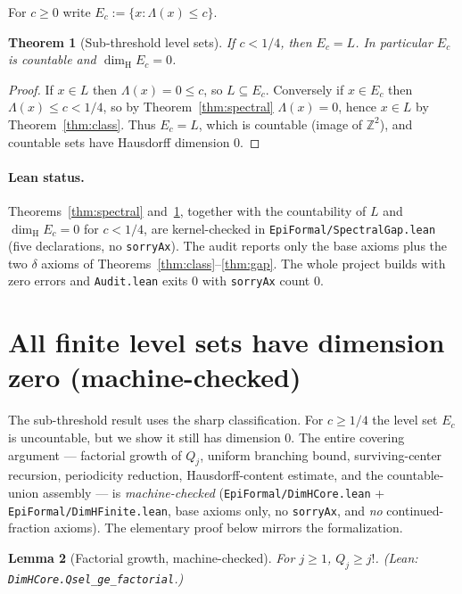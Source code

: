 \documentclass[11pt]{article}
\newtheorem{theorem}{Theorem}
\newtheorem{lemma}[theorem]{Lemma}
\theoremstyle{definition}
\theoremstyle{remark}
\newcommand{\Z}{\mathbb{Z}}
\newcommand{\dimH}{\dim_{\mathrm{H}}}
\newcommand{\Lam}{\Lambda}
\begin{document}
For $c\ge0$ write $E_c:=\{x:\Lam(x)\le c\}$.

\begin{theorem}[Sub-threshold level sets]\label{thm:sub}
If $c<1/4$, then $E_c=L$. In particular $E_c$ is countable and
$\dimH E_c=0$.
\end{theorem}

\begin{proof}
If $x\in L$ then $\Lam(x)=0\le c$, so $L\subseteq E_c$. Conversely if
$x\in E_c$ then $\Lam(x)\le c<1/4$, so by Theorem~\ref{thm:spectral}
$\Lam(x)=0$, hence $x\in L$ by Theorem~\ref{thm:class}. Thus $E_c=L$, which is
countable (image of $\Z^2$), and countable sets have Hausdorff dimension $0$.
\end{proof}

\paragraph{Lean status.} Theorems~\ref{thm:spectral} and~\ref{thm:sub}, together
with the countability of $L$ and $\dimH E_c=0$ for $c<1/4$, are kernel-checked in
\texttt{EpiFormal/SpectralGap.lean} (five declarations, no \texttt{sorryAx}).
The audit reports only the base axioms plus the two $\delta$ axioms of
Theorems~\ref{thm:class}--\ref{thm:gap}. The whole project builds with zero
errors and \texttt{Audit.lean} exits $0$ with \texttt{sorryAx} count $0$.

\section{All finite level sets have dimension zero (machine-checked)}

The sub-threshold result uses the sharp classification. For $c\ge1/4$ the level
set $E_c$ is uncountable, but we show it still has dimension $0$. The entire
covering argument --- factorial growth of $Q_j$, uniform branching bound,
surviving-center recursion, periodicity reduction, Hausdorff-content estimate,
and the countable-union assembly --- is \emph{machine-checked}
(\texttt{EpiFormal/DimHCore.lean} + \texttt{EpiFormal/DimHFinite.lean}, base
axioms only, no \texttt{sorryAx}, and \emph{no} continued-fraction axioms).
The elementary proof below mirrors the formalization.

\begin{lemma}[Factorial growth, machine-checked]\label{lem:factorial}
For $j\ge1$, $Q_j\ge j!$. (Lean: \texttt{DimHCore.Qsel\_ge\_factorial}.)
\end{lemma}
\end{document}

